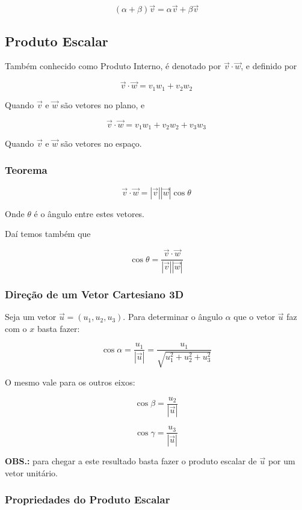 \[
(\alpha + \beta) \vec{v} = \alpha \vec{v} + \beta \vec{v}
\]

\subsection{Produto Escalar}\label{produto-escalar}

Também conhecido como Produto Interno, é denotado por
$\vec{v} \cdot \vec{w}$, e definido por

\[
\vec{v} \cdot \vec{w} = v_1 w_1 + v_2 w_2
\]

Quando $\vec{v}$ e $\vec{w}$ são vetores no plano, e

\[
\vec{v} \cdot \vec{w} = v_1 w_1 + v_2 w_2 + v_3 w_3
\]

Quando $\vec{v}$ e $\vec{w}$ são vetores no espaço.

\subsubsection{Teorema}\label{teorema}

\[
\vec{v} \cdot \vec{w} = |\vec{v}| |\vec{w}| \cos \theta
\]

Onde $\theta$ é o ângulo entre estes vetores.

Daí temos também que

\[
\cos \theta = \frac{\vec{v} \cdot \vec{w}}{|\vec{v}| |\vec{w}|}
\]

\subsubsection{Direção de um Vetor Cartesiano
3D}\label{direuxe7uxe3o-de-um-vetor-cartesiano-3d}

Seja um vetor $\vec{u} = (u_1, u_2, u_3)$. Para determinar o ângulo
$\alpha$ que o vetor $\vec{u}$ faz com o $x$ basta fazer:

\[
\cos \alpha = \frac{u_1}{|\vec{u}|} = \frac{u_1}{\sqrt{u_1^2 + u_2^2 + u_3^2}}
\]

O mesmo vale para os outros eixos:

\[
\cos \beta = \frac{u_2}{|\vec{u}|}
\]

\[
\cos \gamma = \frac{u_3}{|\vec{u}|}
\]

\textbf{OBS.:} para chegar a este resultado basta fazer o produto
escalar de $\vec{u}$ por um vetor unitário.

\subsubsection{Propriedades do Produto
Escalar}\label{propriedades-do-produto-escalar}

